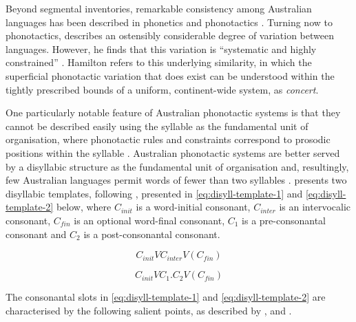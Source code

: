 Beyond segmental inventories, remarkable consistency among Australian languages has been described in phonetics \autocite{dixon_languages_1980} and phonotactics \autocites{dixon_languages_1980}{hamilton_phonetic_1996}{baker_word_2014}. Turning now to phonotactics, \textcite{hamilton_phonetic_1996} describes an ostensibly considerable degree of variation between languages. However, he finds that this variation is ``systematic and highly constrained'' \autocite[p.~29]{hamilton_phonetic_1996}. Hamilton refers to this underlying similarity, in which the superficial phonotactic variation that does exist can be understood within the tightly prescribed bounds of a uniform, continent-wide system, as \emph{concert}.

One particularly notable feature of Australian phonotactic systems is that they cannot be described easily using the syllable as the fundamental unit of organisation, where phonotactic rules and constraints correspond to prosodic positions within the syllable \autocites[e.g.][]{ito_syllable_1988}{goldsmith_autosegmental_1990}. Australian phonotactic systems are better served by a disyllabic structure as the fundamental unit of organisation and, resultingly, few Australian languages permit words of fewer than two syllables \autocite{dixon_languages_1980}. \textcite[p.~75]{hamilton_phonetic_1996} presents two disyllabic templates, following \textcite{dixon_languages_1980}, presented in \eqref{eq:disyll-template-1} and \eqref{eq:disyll-template-2} below, where \(C_{init}\) is a word-initial consonant, \(C_{inter}\) is an intervocalic consonant, \(C_{fin}\) is an optional word-final consonant, \(C_1\) is a pre-consonantal consonant and \(C_2\) is a post-consonantal consonant.

\begin{equation}
C_{init}VC_{inter}V(C_{fin})
\label{eq:disyll-template-1}
\end{equation}

\begin{equation}
C_{init}VC_1.C_2V(C_{fin})
\label{eq:disyll-template-2}
\end{equation}

The consonantal slots in \eqref{eq:disyll-template-1} and \eqref{eq:disyll-template-2} are characterised by the following salient points, as described by \textcite{dixon_languages_1980}, \textcite{hamilton_phonetic_1996} and \textcite{baker_word_2014}.

